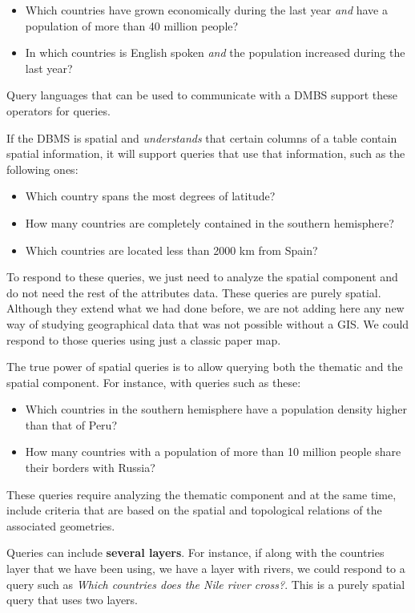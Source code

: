 \begin{itemize}
 \item Which countries have grown economically during the last year \emph{and} have a population of more than 40 million people?
\item In which countries is English spoken \emph{and} the population increased during the last year?
\end{itemize}

Query languages that can be used to communicate with a DMBS support these operators for queries.

If the DBMS is spatial and \emph{understands} that certain columns of a table contain spatial information, it will support queries that use that information, such as the following ones:

\begin{itemize}
\item Which country spans the most degrees of latitude?
\item How many countries are completely contained in the southern hemisphere?
\item Which countries are located less than 2000 km from Spain?
\end{itemize}

To respond to these queries, we just need to analyze the spatial component and do not need the rest of the attributes data. These queries are purely spatial. Although they extend what we had done before, we are not adding here any new way of studying geographical data that was not possible without a GIS. We could respond to those queries using just a classic paper map.

The true power of spatial queries is to allow querying both the thematic and the spatial component. For instance, with queries such as these:

\begin{itemize}
 \item Which countries in the southern hemisphere have a population density higher than that of Peru?
\item How many countries with a population of more than 10 million people share their borders with Russia?
\end{itemize}

These queries require analyzing the thematic component and at the same time, include criteria that are based on the spatial and topological relations of the associated geometries.

Queries can include \textbf{several layers}. For instance, if along with the countries layer that we have been using, we have a layer with rivers, we could respond to a query such as \emph{Which countries does the Nile river cross?}. This is a purely spatial query that uses two layers.

